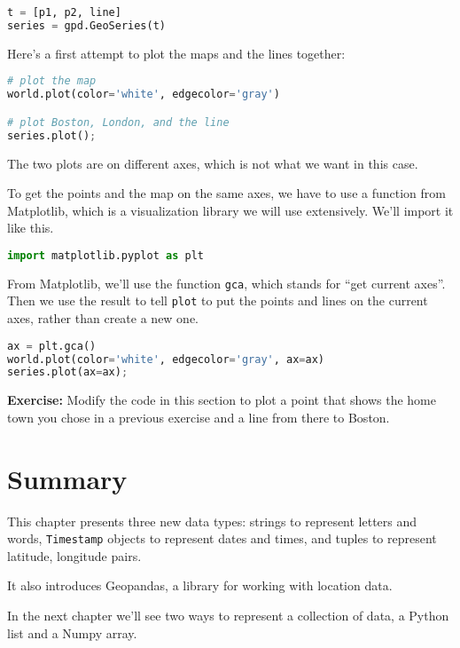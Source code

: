 \begin{lstlisting}[language=Python,style=source]
t = [p1, p2, line]
series = gpd.GeoSeries(t)
\end{lstlisting}

Here's a first attempt to plot the maps and the lines together:

\begin{lstlisting}[language=Python,style=source]
# plot the map
world.plot(color='white', edgecolor='gray')

# plot Boston, London, and the line
series.plot();
\end{lstlisting}

The two plots are on different axes, which is not what we want in this
case.

To get the points and the map on the same axes, we have to use a
function from Matplotlib, which is a visualization library we will use
extensively. We'll import it like this.

\begin{lstlisting}[language=Python,style=source]
import matplotlib.pyplot as plt
\end{lstlisting}

From Matplotlib, we'll use the function \passthrough{\lstinline!gca!},
which stands for ``get current axes''. Then we use the result to tell
\passthrough{\lstinline!plot!} to put the points and lines on the
current axes, rather than create a new one.

\begin{lstlisting}[language=Python,style=source]
ax = plt.gca()
world.plot(color='white', edgecolor='gray', ax=ax)
series.plot(ax=ax);
\end{lstlisting}

\textbf{Exercise:} Modify the code in this section to plot a point that
shows the home town you chose in a previous exercise and a line from
there to Boston.

\hypertarget{summary}{%
\section{Summary}\label{summary}}

This chapter presents three new data types: strings to represent letters
and words, \passthrough{\lstinline!Timestamp!} objects to represent
dates and times, and tuples to represent latitude, longitude pairs.

It also introduces Geopandas, a library for working with location data.

In the next chapter we'll see two ways to represent a collection of
data, a Python list and a Numpy array.


